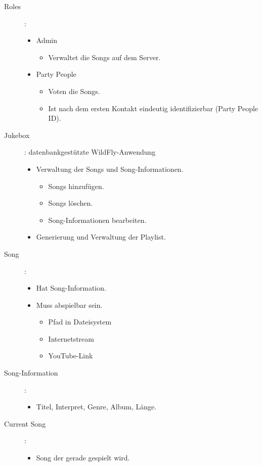 \begin{description}
	\item [Roles]:
	\begin{itemize}
		\item Admin
			\begin{itemize}
				\item Verwaltet die Songs auf dem Server.
			\end{itemize}
		\item Party People
			\begin{itemize}
				\item Voten die Songs.
				\item Ist nach dem ersten Kontakt eindeutig identifizierbar (Party People ID).
			\end{itemize}
	\end{itemize}
	\item [Jukebox]: datenbankgestützte WildFly-Anwendung
	\begin{itemize}
		\item Verwaltung der Songs und Song-Informationen.
			\begin{itemize}
				\item Songs hinzufügen.
				\item Songs löschen.
				\item Song-Informationen bearbeiten.
			\end{itemize}
		\item Generierung und Verwaltung der Playlist.
	\end{itemize}
	\item [Song]:
		\begin{itemize}
			\item Hat Song-Information.
			\item Muss abspielbar sein.
				\begin{itemize}
					\item Pfad in Dateisystem
					\item Internetstream
					\item YouTube-Link
				\end{itemize}
		\end{itemize}
	\item [Song-Information]:
		\begin{itemize}
			\item Titel, Interpret, Genre, Album, Länge.
		\end{itemize}
	\item [Current Song]:
		\begin{itemize}
			\item Song der gerade gespielt wird.

\end{itemize}
\end{description}
